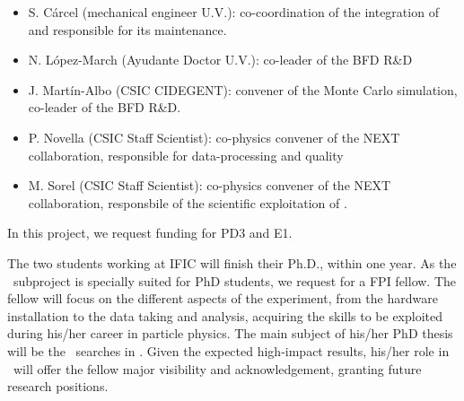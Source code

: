 \begin{itemize}[noitemsep,topsep=0pt,parsep=0pt,partopsep=0pt]
    \item S. C\'arcel (mechanical engineer U.V.): co-coordination of the integration of \Next and responsible for its maintenance.
    \item N. L\'opez-March (Ayudante Doctor U.V.): co-leader of the BFD R\&D
    \item J. Mart\'in-Albo (CSIC CIDEGENT): convener of the Monte Carlo simulation, co-leader of the BFD R\&D. 
    \item P. Novella (CSIC Staff Scientist): co-physics convener of the NEXT collaboration,  responsible for data-processing and quality
    \item M. Sorel (CSIC Staff Scientist): co-physics convener of the NEXT collaboration, responsbile of the scientific exploitation of \Next.
\end{itemize}


In this project, we request funding for PD3 and E1. 

The two students working at IFIC will finish their Ph.D., within one year. As the \sIFIC\ subproject is specially suited for PhD students, we request for a FPI fellow.  The fellow will focus on the different aspects of the experiment, from the hardware installation to the data taking and analysis, acquiring the skills to be exploited during his/her career in particle physics. The main subject of his/her PhD thesis will be the \bb\ searches in \Next. Given the expected high-impact results, his/her role in \Next\ will
offer the fellow major visibility and acknowledgement, granting future research positions.



